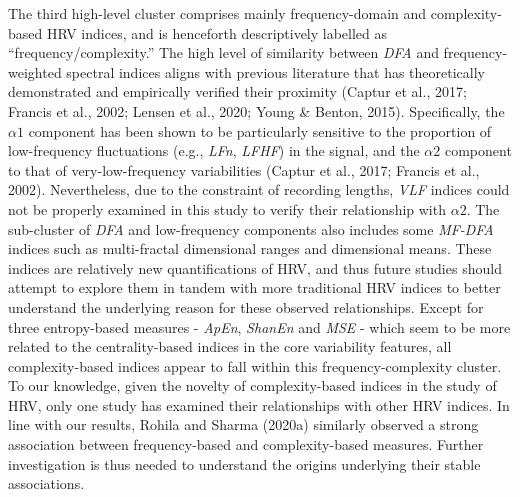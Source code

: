 \documentclass[
  english,
  jou,floatsintext]{apa6}
\begin{document}
The third high-level cluster comprises mainly frequency-domain and complexity-based HRV indices, and is henceforth descriptively labelled as ``frequency/complexity.'' The high level of similarity between \emph{DFA} and frequency-weighted spectral indices aligns with previous literature that has theoretically demonstrated and empirically verified their proximity (Captur et al., 2017; Francis et al., 2002; Lensen et al., 2020; Young \& Benton, 2015). Specifically, the \(\alpha1\) component has been shown to be particularly sensitive to the proportion of low-frequency fluctuations (e.g., \emph{LFn}, \emph{LFHF}) in the signal, and the \(\alpha2\) component to that of very-low-frequency variabilities (Captur et al., 2017; Francis et al., 2002). Nevertheless, due to the constraint of recording lengths, \emph{VLF} indices could not be properly examined in this study to verify their relationship with \(\alpha2\). The sub-cluster of \emph{DFA} and low-frequency components also includes some \emph{MF-DFA} indices such as multi-fractal dimensional ranges and dimensional means. These indices are relatively new quantifications of HRV, and thus future studies should attempt to explore them in tandem with more traditional HRV indices to better understand the underlying reason for these observed relationships. Except for three entropy-based measures - \emph{ApEn}, \emph{ShanEn} and \emph{MSE} - which seem to be more related to the centrality-based indices in the core variability features, all complexity-based indices appear to fall within this frequency-complexity cluster. To our knowledge, given the novelty of complexity-based indices in the study of HRV, only one study has examined their relationships with other HRV indices. In line with our results, Rohila and Sharma (2020a) similarly observed a strong association between frequency-based and complexity-based measures. Further investigation is thus needed to understand the origins underlying their stable associations.
\end{document}
